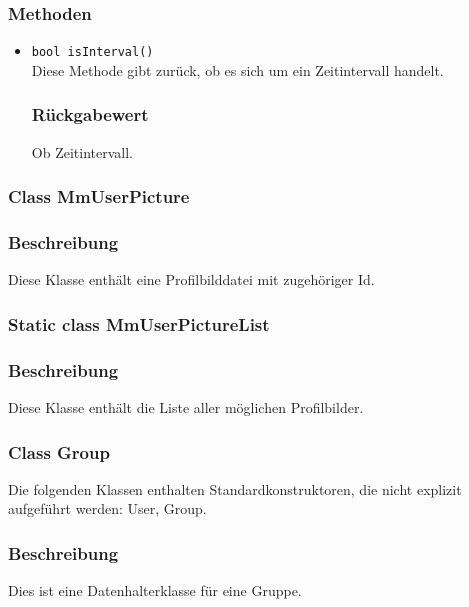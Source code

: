 \documentclass[a4paper]{scrreprt}
\begin{document}
\subsubsection*{Methoden}
\begin{addmargin}[25pt]{0pt}
\begin{itemize}

\item \texttt{bool isInterval()}\\
	Diese Methode gibt zurück, ob es sich um ein Zeitintervall handelt.

	\subsubsection*{Rückgabewert}
	Ob Zeitintervall.

\end{itemize}
\end{addmargin}


\subsubsection{Class MmUserPicture}
\subsubsection*{Beschreibung}
Diese Klasse enthält eine Profilbilddatei mit zugehöriger Id.


\subsubsection{Static class MmUserPictureList}
\subsubsection*{Beschreibung}
Diese Klasse enthält die Liste aller möglichen Profilbilder.


\subsubsection{Class Group}
Die folgenden Klassen enthalten Standardkonstruktoren, die nicht explizit aufgeführt werden: User, Group.
\subsubsection*{Beschreibung}
Dies ist eine Datenhalterklasse für eine Gruppe. 
\end{document}
